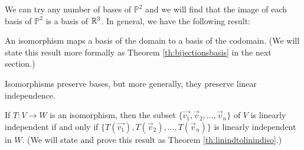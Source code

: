 \documentclass{ximera}
\begin{document}
We can try any number of bases of $\mathbb{P}^2$ and we will find that the image of each basis of $\mathbb{P}^2$ is a basis of $\mathbb{R}^3$.  In general, we have the following result:
\begin{fact}
An isomorphism maps a basis of the domain to a basis of the codomain. (We will state this result more formally as Theorem \ref{th:bijectionsbasis} in the next section.)
\end{fact}

Isomorphisms preserve bases, but more generally, they preserve linear independence.  
\begin{fact}
If $T:V\rightarrow W$ is an isomorphism, then the subset $\{\vec{v_1}, \vec{v}_2,\ldots ,\vec{v}_n\}$ of $V$ is linearly independent if and only if $\{T(\vec{v_1}), T(\vec{v}_2),\ldots ,T(\vec{v}_n)\}$ is linearly independent in $W$.  (We will state and prove this result as Theorem \ref{th:linindtolinindiso}.)
\end{fact}
\end{document}
